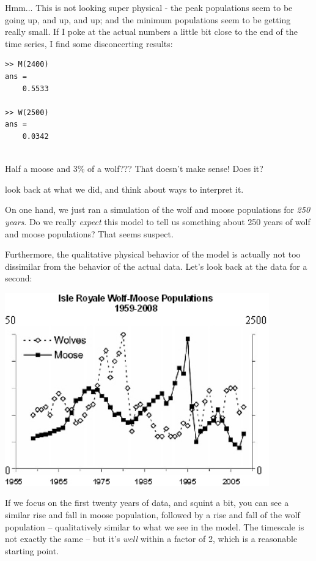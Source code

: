 \documentclass{tufte-handout}
\newcommand{\beforefig}{\vspace{0.2in}}
\newcommand{\afterfig}{\vspace{0.2in}}
\begin{document}
Hmm... This is not looking super physical - the peak populations seem to be going up, and up, and up; and the minimum populations seem to be getting really small.  If I poke at the actual numbers a little bit close to the end of the time series, I find some disconcerting results:

\begin{verbatim}
>> M(2400)
ans =
    0.5533
    
>> W(2500)
ans =
    0.0342
    
\end{verbatim}
Half a moose and $3\%$ of a wolf???  That doesn't make sense!  Does it?
 
 look back at what we did, and think about ways to interpret it.  
 
 On one hand, we just ran a simulation of the wolf and moose populations for {\it 250 years}.  Do we really {\it expect} this model to tell us something  about 250 years of wolf and moose populations?  That seems suspect.

Furthermore, the qualitative physical behavior of the model is actually not too dissimilar from the behavior of the actual data.  Let's look back at the data for a second:

\beforefig
\includegraphics[width=4.5in]{figs/wolfmoosedata.jpg}


\afterfig

If we focus on the first twenty years of data, and squint a bit, you can see a similar rise and fall in moose population, followed by a rise and fall of the wolf population -- qualitatively similar to what we see in the model. The timescale is not exactly the same -- but it's {\it well} within a factor of 2, which is a reasonable starting point.
\end{document}
